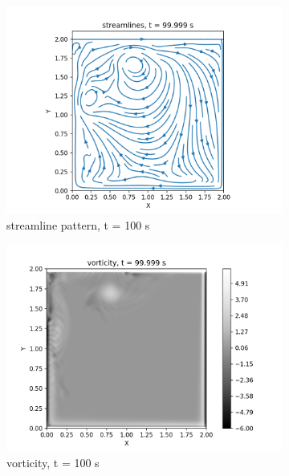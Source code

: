 \begin{figure}[!h]
    \begin{subfigure}{0.5\textwidth}
       \centering
        \includegraphics[scale =0.5]{supporting_documents/contours/streamlines/streamlines_0000000100.png}
        \caption{streamline pattern, t = 100 s}
    \end{subfigure}
   \hfill
    \begin{subfigure}{0.5\textwidth}
       \centering
        \includegraphics[scale =0.5]{supporting_documents/contours/vorticity/vorticity_0000000100.png}
        \caption{vorticity, t = 100 s}
    \end{subfigure}
   \hfill
    \begin{subfigure}{0.5\textwidth}

\end{subfigure}
\end{figure}
